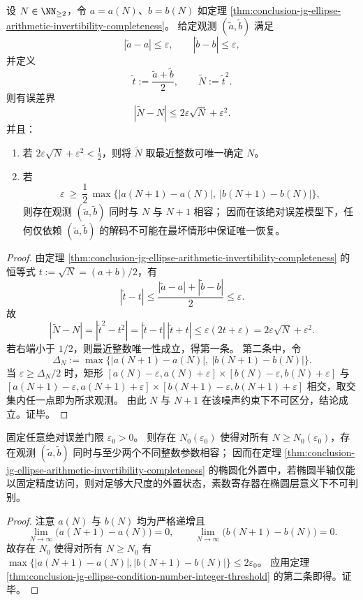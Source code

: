\begin{theorem}\label{thm:conclusion-jg-ellipse-condition-number-integer-threshold}
设 \(N\in\NN_{\ge 2}\)，令 \(a=a(N)\)、\(b=b(N)\) 如定理 \ref{thm:conclusion-jg-ellipse-arithmetic-invertibility-completeness}。
给定观测 \((\tilde a,\tilde b)\) 满足
\[
|\tilde a-a|\le\varepsilon,
\qquad
|\tilde b-b|\le\varepsilon,
\]
并定义
\[
\tilde t:=\frac{\tilde a+\tilde b}{2},
\qquad
\tilde N:=\tilde t^{2}.
\]
则有误差界
\[
|\tilde N-N|
\le
2\varepsilon\sqrt N+\varepsilon^2.
\]
并且：
\begin{enumerate}
  \item 若 \(2\varepsilon\sqrt N+\varepsilon^2<\tfrac12\)，则将 \(\tilde N\) 取最近整数可唯一确定 \(N\)。
  \item 若
  \[
  \varepsilon\ \ge\ \frac12\,\max\!\bigl\{|a(N+1)-a(N)|,\ |b(N+1)-b(N)|\bigr\},
  \]
  则存在观测 \((\tilde a,\tilde b)\) 同时与 \(N\) 与 \(N+1\) 相容；
  因而在该绝对误差模型下，任何仅依赖 \((\tilde a,\tilde b)\) 的解码不可能在最坏情形中保证唯一恢复。
\end{enumerate}
\end{theorem}
\begin{proof}
由定理 \ref{thm:conclusion-jg-ellipse-arithmetic-invertibility-completeness} 的恒等式 \(t:=\sqrt N=(a+b)/2\)，有
\[
|\tilde t-t|
\le
\frac{|\tilde a-a|+|\tilde b-b|}{2}
\le
\varepsilon.
\]
故
\[
|\tilde N-N|
=|\tilde t^{2}-t^{2}|
=|\tilde t-t|\,|\tilde t+t|
\le
\varepsilon(2t+\varepsilon)
=2\varepsilon\sqrt N+\varepsilon^2.
\]
若右端小于 \(1/2\)，则最近整数唯一性成立，得第一条。
第二条中，令
\[
\Delta_N:=\max\!\bigl\{|a(N+1)-a(N)|,\ |b(N+1)-b(N)|\bigr\}.
\]
当 \(\varepsilon\ge \Delta_N/2\) 时，矩形
\(
[a(N)-\varepsilon,a(N)+\varepsilon]\times[b(N)-\varepsilon,b(N)+\varepsilon]
\)
与
\(
[a(N+1)-\varepsilon,a(N+1)+\varepsilon]\times[b(N+1)-\varepsilon,b(N+1)+\varepsilon]
\)
相交，取交集内任一点即为所求观测。
由此 \(N\) 与 \(N+1\) 在该噪声约束下不可区分，结论成立。证毕。
\end{proof}

\begin{corollary}[固定精度噪声下的素数寄存器信息屏障]\label{cor:conclusion-jg-ellipse-fixed-epsilon-information-barrier}
固定任意绝对误差门限 \(\varepsilon_0>0\)。
则存在 \(N_0(\varepsilon_0)\) 使得对所有 \(N\ge N_0(\varepsilon_0)\)，存在观测 \((\tilde a,\tilde b)\) 同时与至少两个不同整数参数相容；
因而在定理 \ref{thm:conclusion-jg-ellipse-arithmetic-invertibility-completeness} 的椭圆化外置中，若椭圆半轴仅能以固定精度访问，则对足够大尺度的外置状态，素数寄存器在椭圆层意义下不可判别。
\end{corollary}
\begin{proof}
注意 \(a(N)\) 与 \(b(N)\) 均为严格递增且
\[
\lim_{N\to\infty}\bigl(a(N+1)-a(N)\bigr)=0,
\qquad
\lim_{N\to\infty}\bigl(b(N+1)-b(N)\bigr)=0.
\]
故存在 \(N_0\) 使得对所有 \(N\ge N_0\) 有
\(
\max\{|a(N+1)-a(N)|,|b(N+1)-b(N)|\}\le 2\varepsilon_0
\)。
应用定理 \ref{thm:conclusion-jg-ellipse-condition-number-integer-threshold} 的第二条即得。证毕。
\end{proof}

